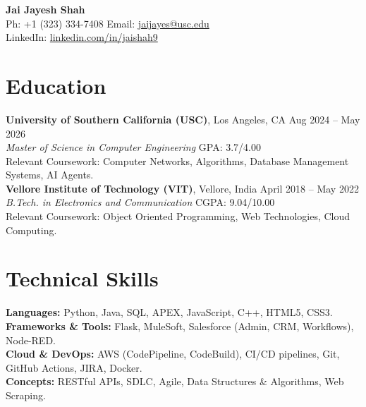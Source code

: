 \documentclass[letterpaper,10pt]{article}
\begin{document}
\begin{center}
    {\LARGE \textbf{Jai Jayesh Shah}} \\
    \vspace{2pt}
    \small
    Ph: +1 (323) 334-7408 \quad Email: \href{mailto:jaijayes@usc.edu}{jaijayes@usc.edu} \\
    LinkedIn: \href{https://www.linkedin.com/in/jaishah9}{linkedin.com/in/jaishah9} \\
    \vspace{-8pt}
\end{center}

\section*{Education}
\textbf{University of Southern California (USC)}, Los Angeles, CA \hfill Aug 2024 -- May 2026 \\
\textit{Master of Science in Computer Engineering} \hfill GPA: 3.7/4.00 \\
Relevant Coursework: Computer Networks, Algorithms, Database Management Systems, AI Agents. \\
\vspace{2pt}
\textbf{Vellore Institute of Technology (VIT)}, Vellore, India \hfill April 2018 -- May 2022 \\
\textit{B.Tech. in Electronics and Communication} \hfill CGPA: 9.04/10.00 \\
Relevant Coursework: Object Oriented Programming, Web Technologies, Cloud Computing.

\section*{Technical Skills}
\textbf{Languages:} Python, Java, SQL, APEX, JavaScript, C++, HTML5, CSS3. \\
\textbf{Frameworks \& Tools:} Flask, MuleSoft, Salesforce (Admin, CRM, Workflows), Node-RED. \\
\textbf{Cloud \& DevOps:} AWS (CodePipeline, CodeBuild), CI/CD pipelines, Git, GitHub Actions, JIRA, Docker. \\
\textbf{Concepts:} RESTful APIs, SDLC, Agile, Data Structures \& Algorithms, Web Scraping.

\end{document}
